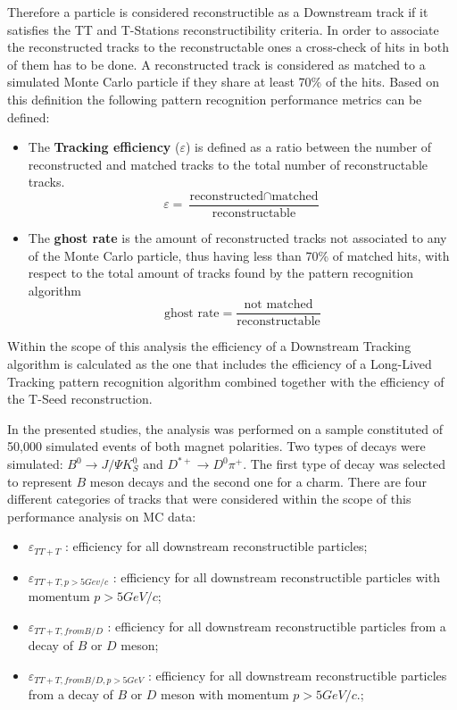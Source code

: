 Therefore a particle is considered reconstructible as a Downstream track if it satisfies the TT and T-Stations reconstructibility criteria. In order to associate the reconstructed tracks to the reconstructable ones a cross-check of hits in both of them has to be done. A reconstructed track is considered as matched to a simulated Monte Carlo particle if they share at least 70\% of the hits.  
Based on this definition the following pattern recognition performance metrics can be defined: 

\begin{itemize}
    \item The \textbf{Tracking efficiency} ($\varepsilon$) is defined as a ratio between the number of reconstructed and matched tracks to the total number of reconstructable tracks. 
    \begin{equation}
        \varepsilon  = \frac{\textrm{reconstructed} \cap  \textrm{matched}}{\textrm{reconstructable}}
    \end{equation}
    \item The \textbf{ghost rate} is the amount of reconstructed tracks not associated to any of the Monte Carlo particle, thus having less than 70\% of matched hits, with respect to the total amount of tracks found by the pattern recognition algorithm
    \begin{equation}
       \textrm{ghost rate} =  \frac{\textrm{not matched}}{\textrm{reconstructable}}
    \end{equation}
\end{itemize}

 Within the scope of this analysis the efficiency of a Downstream Tracking algorithm is calculated as the one that includes the efficiency of a Long-Lived Tracking pattern recognition algorithm combined together with the efficiency of the T-Seed reconstruction.

In the presented studies, the analysis was performed on a sample constituted of 50,000 simulated events of both magnet polarities. Two types of decays were simulated: $B^{0} \rightarrow J/\Psi K^{0}_{S}$ and $D^{*+} \rightarrow D^{0}\pi^+$. The first type of decay was selected to represent $B$ meson decays and the second one for a charm. 
There are four different categories of tracks that were considered within the scope of this performance analysis on MC data:

\begin{itemize}
    \item $\varepsilon_{TT+T}$ : efficiency for all downstream reconstructible particles;
    \item $\varepsilon_{TT+T, p>5Gev/c}$ : efficiency for all downstream reconstructible particles with momentum $p> 5 GeV/c$;
    \item $\varepsilon_{TT+T, from B/D}$ : efficiency for all downstream reconstructible particles from a decay of $B$ or $D$ meson;
    \item $\varepsilon_{TT+T, from B/D, p>5 GeV }$ : efficiency for all downstream reconstructible particles from a decay of $B$ or $D$ meson with momentum $p> 5 GeV/c$.;
\end{itemize}

